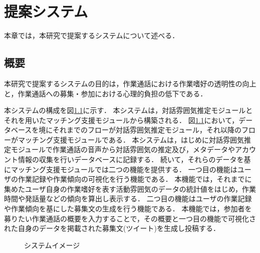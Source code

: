 \chapter{提案システム\label{sec:proposal_system}}
\thispagestyle{plain}

本章では，本研究で提案するシステムについて述べる．

\section{概要}

本研究で提案するシステムの目的は，作業通話における作業嗜好の透明性の向上と，作業通話への募集・参加における心理的負担の低下である．

本システムの構成を図\ref{fig:matching_system_big_arrow}に示す．
本システムは，対話雰囲気推定モジュールとそれを用いたマッチング支援モジュールから構築される．
図\ref{fig:matching_system_big_arrow}において，データベースを境にそれまでのフローが対話雰囲気推定モジュール，それ以降のフローがマッチング支援モジュールである．
本システムは，はじめに対話雰囲気推定モジュールで作業通話の音声から対話雰囲気の推定及び，メタデータやアカウント情報の収集を行いデータベースに記録する．
続いて，それらのデータを基にマッチング支援モジュールでは二つの機能を提供する．
一つ目の機能はユーザの作業記録や作業傾向の可視化を行う機能である．
本機能では，それまでに集めたユーザ自身の作業嗜好を表す活動雰囲気のデータの統計値をはじめ，作業時間や発話量などの傾向を算出し表示する．
二つ目の機能はユーザの作業記録や作業傾向を基にした募集文の生成を行う機能である．
本機能では，参加者を募りたい作業通話の概要を入力することで，その概要と一つ目の機能で可視化された自身のデータを掲載された募集文(ツイート)を生成し投稿する．

\begin{figure}
    \centering
    \caption{システムイメージ}
    \label{fig:matching_system_big_arrow}
\end{figure}

